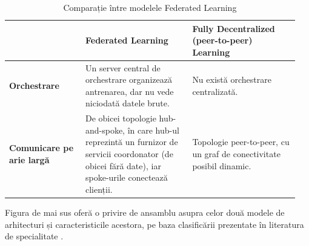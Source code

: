 \documentclass[../../main.tex]{subfiles}
\begin{document}
\begin{table}[h!]
    \centering
    \begin{tabular}{|p{0.25\linewidth}|p{0.35\linewidth}|p{0.35\linewidth}|}
        \hline
        \textbf{} & \textbf{Federated Learning} & \textbf{Fully Decentralized (peer-to-peer) Learning} \\
        \hline
        \textbf{Orchestrare} & 
        Un server central de orchestrare organizează antrenarea, dar nu vede niciodată datele brute. & 
        Nu există orchestrare centralizată. \\
        \hline
        \textbf{Comunicare pe arie largă} & 
        De obicei topologie hub-and-spoke, în care hub-ul reprezintă un furnizor de servicii coordonator (de obicei fără date), iar spoke-urile conectează clienții. & 
        Topologie peer-to-peer, cu un graf de conectivitate posibil dinamic. \\
        \hline
    \end{tabular}
    \caption{Comparație între modelele Federated Learning \cite{kairouz2021federated}}
    \label{tab:fl_models_comparison}
\end{table}

Figura de mai sus oferă o privire de ansamblu asupra celor două modele de arhitecturi și caracteristicile acestora, pe baza clasificării prezentate în literatura de specialitate \cite{kairouz2021federated}.
\end{document}
